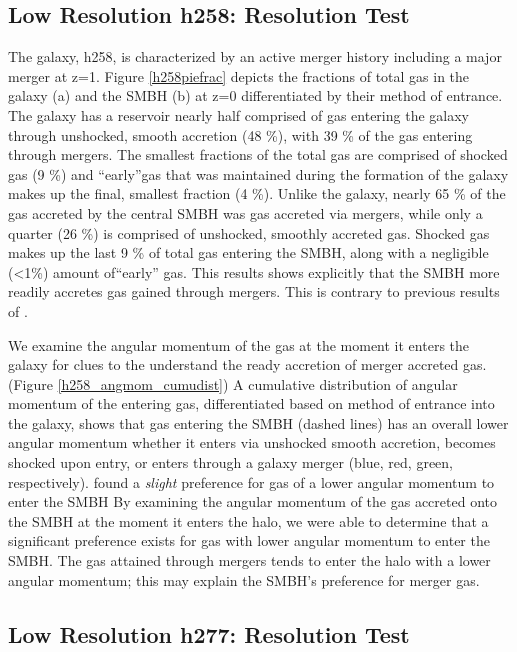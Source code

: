 \documentclass[manuscript]{aastex}
\begin{document}
\subsection{Low Resolution h258: Resolution Test}
	
The galaxy, h258, is characterized by an active merger history including a major merger at z=1. Figure \ref{h258piefrac} depicts the fractions of total gas in the galaxy (a) and the SMBH (b) at z=0 differentiated by their method of entrance. The galaxy has a reservoir nearly half comprised of gas entering the galaxy through unshocked, smooth accretion (48 \%), with 39 \% of the gas entering through mergers. The smallest fractions of the total gas are comprised of shocked gas (9 \%) and ``early''gas that was maintained during the formation of the galaxy makes up the final, smallest fraction (4 \%). Unlike the galaxy, nearly 65 \% of the gas accreted by the central SMBH was gas accreted via mergers, while only a quarter (26 \%) is comprised of unshocked, smoothly accreted gas. Shocked gas makes up the last 9 \% of total gas entering the SMBH, along with a negligible (<1\%) amount of``early'' gas. This results shows explicitly that the SMBH more readily accretes gas gained through mergers. This is contrary to previous results of \cite{Bellovary2013}.

We examine the angular momentum of the gas at the moment it enters the galaxy for clues to the understand the ready accretion of merger accreted gas. (Figure \ref{h258_angmom_cumudist}) A cumulative distribution of angular momentum of the entering gas, differentiated based on method of entrance into the galaxy, shows that gas entering the SMBH (dashed lines) has an overall lower angular momentum whether it enters via unshocked smooth accretion, becomes shocked upon entry, or enters through a galaxy merger (blue, red, green, respectively).
\citep{Bellovary2013} found a \textit{slight} preference for gas of a lower angular momentum to enter the SMBH By examining the angular momentum of the gas accreted onto the SMBH at the moment it enters the halo, we were able to determine that a significant preference exists for gas with lower angular momentum to enter the SMBH. The gas attained through mergers tends to enter the halo with a lower angular momentum; this may explain the SMBH's preference for merger gas. 


\subsection{Low Resolution h277: Resolution Test}
	
\end{document}
